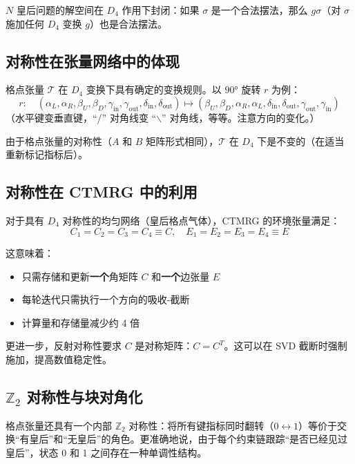 \documentclass[12pt,a4paper]{ctexart}
\begin{document}
$N$ 皇后问题的解空间在 $D_4$ 作用下封闭：如果 $\sigma$ 是一个合法摆法，那么 $g\sigma$（对 $\sigma$ 施加任何 $D_4$ 变换 $g$）也是合法摆法。

\subsection{对称性在张量网络中的体现}

格点张量 $\mathcal{T}$ 在 $D_4$ 变换下具有确定的变换规则。以 $90°$ 旋转 $r$ 为例：
\begin{equation}
r: \quad (\alpha_L, \alpha_R, \beta_U, \beta_D, \gamma_{\text{in}}, \gamma_{\text{out}}, \delta_{\text{in}}, \delta_{\text{out}}) \mapsto (\beta_U, \beta_D, \alpha_R, \alpha_L, \delta_{\text{in}}, \delta_{\text{out}}, \gamma_{\text{out}}, \gamma_{\text{in}})
\end{equation}
（水平键变垂直键，``/'' 对角线变 ``$\backslash$'' 对角线，等等。注意方向的变化。）

由于格点张量的对称性（$A$ 和 $B$ 矩阵形式相同），$\mathcal{T}$ 在 $D_4$ 下是不变的（在适当重新标记指标后）。

\subsection{对称性在 CTMRG 中的利用}

对于具有 $D_4$ 对称性的均匀网络（皇后格点气体），CTMRG 的环境张量满足：
\begin{equation}
C_1 = C_2 = C_3 = C_4 \equiv C, \quad E_1 = E_2 = E_3 = E_4 \equiv E
\end{equation}

这意味着：
\begin{itemize}
\item 只需存储和更新\textbf{一个}角矩阵 $C$ 和\textbf{一个}边张量 $E$
\item 每轮迭代只需执行一个方向的吸收-截断
\item 计算量和存储量减少约 4 倍
\end{itemize}

更进一步，反射对称性要求 $C$ 是对称矩阵：$C = C^T$。这可以在 SVD 截断时强制施加，提高数值稳定性。

\subsection{$\mathbb{Z}_2$ 对称性与块对角化}

格点张量还具有一个内部 $\mathbb{Z}_2$ 对称性：将所有键指标同时翻转（$0 \leftrightarrow 1$）等价于交换``有皇后''和``无皇后''的角色。更准确地说，由于每个约束链跟踪``是否已经见过皇后''，状态 0 和 1 之间存在一种单调性结构。
\end{document}
